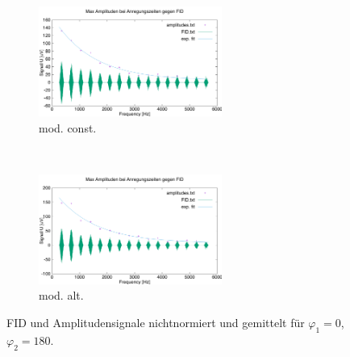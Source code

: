 \documentclass{article}
\begin{document}
        \begin{figure}[H]
            \centering
            \begin{subfigure}[b]{0.4\textwidth}
                \centering
                \includegraphics[width=6cm]{../Bilddateien/CPMG-0-180-constant-avg.png}
                \caption{mod. const.}
                \label{fig:CPMG-0-180-constant-avg}
            \end{subfigure}
            \
            \begin{subfigure}[b]{0.4\textwidth}
                \centering
                \includegraphics[width=6cm]{../Bilddateien/CPMG-0-180-alternating-avg.png}
                \caption{mod. alt.}
                \label{fig:CPMG-0-180-alternating-avg}
            \end{subfigure}
            \caption{FID und Amplitudensignale nichtnormiert und gemittelt für $\varphi_1 = 0$, $\varphi_2 = 180$.}
            \label{fig:CPMG-0-180-avg}
        \end{figure}
\end{document}

